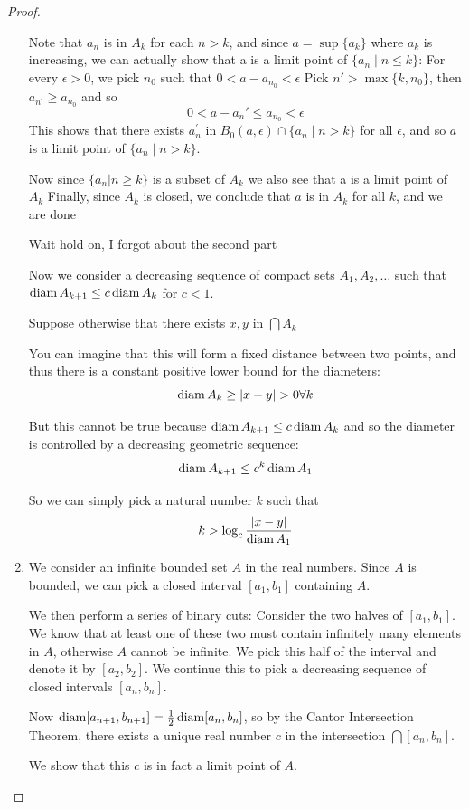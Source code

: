 \begin{proof}
\begin{enumerate}
Note that $a_n$ is in $A_k$ for each $n>k$, and since $a=\sup\{a_k\}$ where $a_k$ is increasing, we can actually show that a is a limit point of $\{a_n \mid n \le k\}$:
For every $\epsilon>0$, we pick $n_0$ such that $0 < a-a_{n_0} < \epsilon$
Pick $n\prime > \max\{k,n_0\}$, then $a_{n^\prime} \ge a_{n_0}$ and so
\[ 0<a-a_n\prime \le a_{n_0} < \epsilon \]
This shows that there exists $a_n^\prime$ in $B_0(a,\epsilon) \cap \{a_n \mid n>k\}$ for all $\epsilon$, and so $a$ is a limit point of $\{a_n \mid n>k\}$.

Now since $\{a_n|n \ge k\}$ is a subset of $A_k$ we also see that a is a limit point of $A_k$
Finally, since $A_k$ is closed, we conclude that $a$ is in $A_k$ for all $k$, and we are done

Wait hold on, I forgot about the second part

Now we consider a decreasing sequence of compact sets $A_1, A_2, \dots$ such that $\operatorname{diam} A_{k+1} \le c \operatorname{diam} A_k$ for $c<1$.

Suppose otherwise that there exists $x, y$ in $\bigcap A_k$

You can imagine that this will form a fixed distance between two points, and thus there is a constant positive lower bound for the diameters:
\[ \operatorname{diam} A_k \ge |x-y| > 0 \forall k \]

But this cannot be true because $\operatorname{diam} A_{k+1} \le c \operatorname{diam} A_k$ and so the diameter is controlled by a decreasing geometric sequence:
\[ \operatorname{diam} A_{k+1} \le c^k \operatorname{diam} A_1 \]

So we can simply pick a natural number $k$ such that
\[ k > \log_c \frac{|x-y|}{\operatorname{diam} A_1} \]

\item We consider an infinite bounded set $A$ in the real numbers. Since $A$ is bounded, we can pick a closed interval $[a_1,b_1]$ containing $A$.

We then perform a series of binary cuts: Consider the two halves of $[a_1,b_1]$. We know that at least one of these two must contain infinitely many elements in $A$, otherwise $A$ cannot be infinite. We pick this half of the interval and denote it by $[a_2,b_2]$. We continue this to pick a decreasing sequence of closed intervals $[a_n,b_n]$.

Now $\operatorname{diam} [a_{n+1},b_{n+1}] = \frac{1}{2} \operatorname{diam} [a_n,b_n]$, so by the Cantor Intersection Theorem, there exists a unique real number $c$ in the intersection $\bigcap[a_n,b_n]$.

We show that this $c$ is in fact a limit point of $A$.


\end{enumerate}
\end{proof}
